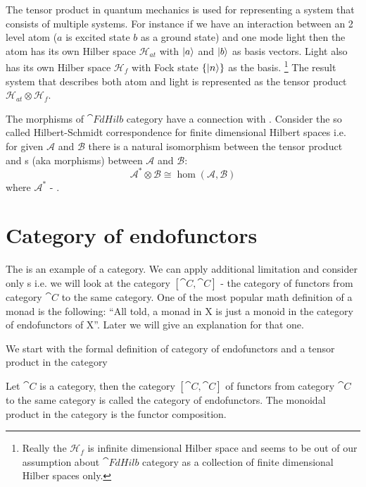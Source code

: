 The tensor product in quantum mechanics is used for
representing a system that consists of multiple systems. For instance
if we have an interaction between an 2 level atom ($a$ is excited
state $b$ as a ground state) and one mode light then the
atom has its own Hilber space $\mathcal{H}_{at}$ with $\ket{a}$ and
$\ket{b}$ as basis 
vectors.  Light also has its own Hilber space $\mathcal{H}_f$ with Fock state
$\{\ket{n}\}$ as the basis.
\footnote{
  Really the $\mathcal{H}_f$ is infinite dimensional Hilber space and
  seems to be out of our assumption about $\cat{FdHilb}$ category as
  a collection of finite dimensional Hilber spaces only.
}
The result system that describes both atom
and light is represented as the tensor product $\mathcal{H}_{at}
\otimes \mathcal{H}_f$.

\begin{remark}
The morphisms of $\cat{FdHilb}$ category have a connection with
. Consider the so called Hilbert-Schmidt
correspondence for finite dimensional Hilbert spaces i.e. for given
$\mathcal{A}$ and $\mathcal{B}$ there is a natural isomorphism between
the tensor product and s (aka morphisms) between
$\mathcal{A}$ and $\mathcal{B}$:
\[
\mathcal{A}^\ast \otimes \mathcal{B} \cong \hom(\mathcal{A}, \mathcal{B})
\]
where $\mathcal{A}^\ast$ - .
\end{remark}

\section{Category of endofunctors}

The  is an example of a category. We can
apply additional limitation and consider only
s i.e. we will look at the category
$[\cat{C}, \cat{C}]$ - the category of functors from category $\cat{C}$ to
the same category. One of the most popular math definition of a monad
is the following: 
``All told, a monad in X is just a monoid in the category of
endofunctors of X''\cite{bib:maclane98}.
Later we will give an explanation for that one.

We start with the formal definition of category of endofunctors and a
tensor product in the category
\begin{definition}
\label{def:category_of_endofunctors}
Let $\cat{C}$ is a category, then  the category $[\cat{C}, \cat{C}]$ of
functors from category $\cat{C}$ to the same category is called the
category of endofunctors. The monoidal product in the category is the
functor composition. 
\end{definition}

